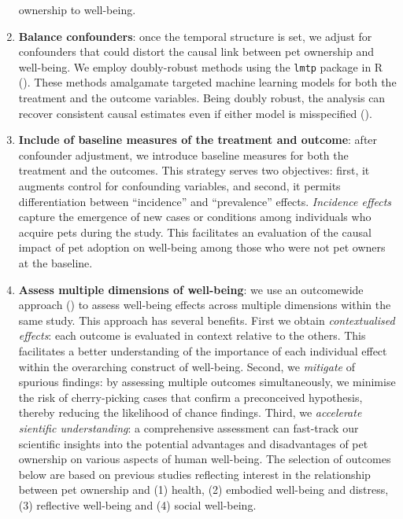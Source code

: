 \documentclass[
  singlecolumn,
  9pt]{article}
\begin{document}
\begin{enumerate}
  ownership to well-being.
\item
  \textbf{Balance confounders}: once the temporal structure is set, we
  adjust for confounders that could distort the causal link between pet
  ownership and well-being. We employ doubly-robust methods using the
  \texttt{lmtp} package in R (). These methods amalgamate targeted machine learning models
  for both the treatment and the outcome variables. Being doubly robust,
  the analysis can recover consistent causal estimates even if either
  model is misspecified ().
\item
  \textbf{Include of baseline measures of the treatment and outcome}:
  after confounder adjustment, we introduce baseline measures for both
  the treatment and the outcomes. This strategy serves two objectives:
  first, it augments control for confounding variables, and second, it
  permits differentiation between ``incidence'' and ``prevalence''
  effects. \emph{Incidence effects} capture the emergence of new cases
  or conditions among individuals who acquire pets during the study.
  This facilitates an evaluation of the causal impact of pet adoption on
  well-being among those who were not pet owners at the baseline.
\item
  \textbf{Assess multiple dimensions of well-being}: we use an
  outcomewide approach () to assess well-being effects across multiple
  dimensions within the same study. This approach has several benefits.
  First we obtain \emph{contextualised effects}: each outcome is
  evaluated in context relative to the others. This facilitates a better
  understanding of the importance of each individual effect within the
  overarching construct of well-being. Second, we \emph{mitigate} of
  spurious findings: by assessing multiple outcomes simultaneously, we
  minimise the risk of cherry-picking cases that confirm a preconceived
  hypothesis, thereby reducing the likelihood of chance findings. Third,
  we \emph{accelerate sientific understanding}: a comprehensive
  assessment can fast-track our scientific insights into the potential
  advantages and disadvantages of pet ownership on various aspects of
  human well-being. The selection of outcomes below are based on
  previous studies reflecting interest in the relationship between pet
  ownership and (1) health, (2) embodied well-being and distress, (3)
  reflective well-being and (4) social well-being.

\end{enumerate}
\end{document}
